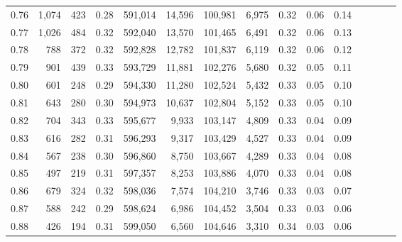 \begin{tabular}{rrrcrrrrrrrrrrr}
0.76 &   1,074 &    423 &                                       0.28 &  591,014 &   14,596 &  100,981 &    6,975 &  0.32 &  0.06 &                         0.14 \\
0.77 &   1,026 &    484 &                                       0.32 &  592,040 &   13,570 &  101,465 &    6,491 &  0.32 &  0.06 &                         0.13 \\
0.78 &     788 &    372 &                                       0.32 &  592,828 &   12,782 &  101,837 &    6,119 &  0.32 &  0.06 &                         0.12 \\
0.79 &     901 &    439 &                                       0.33 &  593,729 &   11,881 &  102,276 &    5,680 &  0.32 &  0.05 &                         0.11 \\
0.80 &     601 &    248 &                                       0.29 &  594,330 &   11,280 &  102,524 &    5,432 &  0.33 &  0.05 &                         0.10 \\
0.81 &     643 &    280 &                                       0.30 &  594,973 &   10,637 &  102,804 &    5,152 &  0.33 &  0.05 &                         0.10 \\
0.82 &     704 &    343 &                                       0.33 &  595,677 &    9,933 &  103,147 &    4,809 &  0.33 &  0.04 &                         0.09 \\
0.83 &     616 &    282 &                                       0.31 &  596,293 &    9,317 &  103,429 &    4,527 &  0.33 &  0.04 &                         0.09 \\
0.84 &     567 &    238 &                                       0.30 &  596,860 &    8,750 &  103,667 &    4,289 &  0.33 &  0.04 &                         0.08 \\
0.85 &     497 &    219 &                                       0.31 &  597,357 &    8,253 &  103,886 &    4,070 &  0.33 &  0.04 &                         0.08 \\
0.86 &     679 &    324 &                                       0.32 &  598,036 &    7,574 &  104,210 &    3,746 &  0.33 &  0.03 &                         0.07 \\
0.87 &     588 &    242 &                                       0.29 &  598,624 &    6,986 &  104,452 &    3,504 &  0.33 &  0.03 &                         0.06 \\
0.88 &     426 &    194 &                                       0.31 &  599,050 &    6,560 &  104,646 &    3,310 &  0.34 &  0.03 &                         0.06 \\

\end{tabular}
